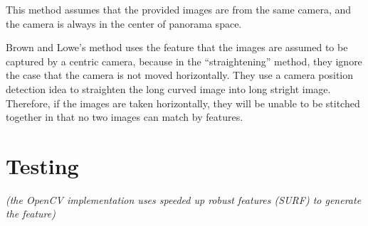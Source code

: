 \documentclass[10pt,twocolumn,letterpaper]{article}
\begin{document}
This method assumes that the provided images are from the same camera, and the camera is always in the center of panorama space.



Brown and Lowe's method uses the feature that the images are assumed to be captured by a centric camera,
because in the ``straightening'' method, they ignore the case that the camera is not moved horizontally.
They use a camera position detection idea to straighten the long curved image into long stright image.
Therefore, if the images are taken horizontally, they will be unable to be stitched together in that no two images can match by features.



\section{Testing}
\textit{(the OpenCV implementation uses speeded up robust features (SURF) \cite{surf} to generate the feature)}
\end{document}
